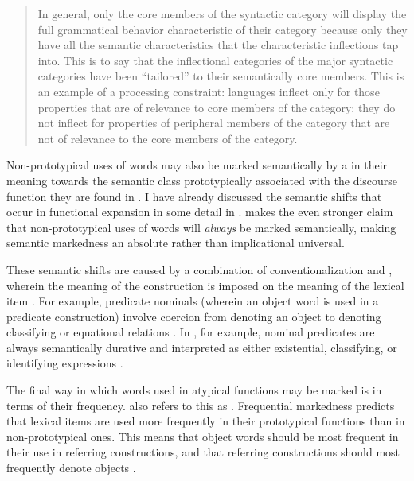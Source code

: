 \blockquote[{\cite[86]{Croft1991}}]{In general, only the core members of the syntactic category will display the full grammatical behavior characteristic of their category because only they have all the semantic characteristics that the characteristic inflections tap into. This is to say that the inflectional categories of the major syntactic categories have been \enquote{tailored} to their semantically core members. This is an example of a processing constraint: languages inflect only for those properties that are of relevance to core members of the category; they do not inflect for properties of peripheral members of the category that are not of relevance to the core members of the category.}

Non-prototypical uses of words may also be marked semantically by a  in their meaning towards the semantic class prototypically associated with the discourse function they are found in \parencites[96]{Croft2000}[73]{Croft2001b}[68]{CroftLier2012}. I have already discussed the semantic shifts that occur in functional expansion in some detail in . \textcite[60--61]{Croft1991} makes the even stronger claim that non-prototypical uses of words will \emph{always} be marked semantically, making semantic markedness an absolute rather than implicational universal.

These semantic shifts are caused by a combination of conventionalization and , wherein the meaning of the construction is imposed on the meaning of the lexical item \parencites{Pustejovsky1991}[69, 108]{Croft1991}[252]{PantherThornburg2007}{AudringBooij2016}. For example, predicate nominals (wherein an object word is used in a predicate construction) involve coercion from denoting an object to denoting classifying or equational relations \parencite[69]{Croft1991}. In , for example, nominal predicates are always semantically durative and interpreted as either existential, classifying, or identifying expressions \parencite[47]{Nakayama2001}.

The final way in which words used in atypical functions may be marked is in terms of their frequency. \textcite[59, 87]{Croft1991} also refers to this as . Frequential markedness predicts that lexical items are used more frequently in their prototypical functions than in non-prototypical ones. This means that object words should be most frequent in their use in referring constructions, and that referring constructions should most frequently denote objects \parencite[87]{Croft1991}.

